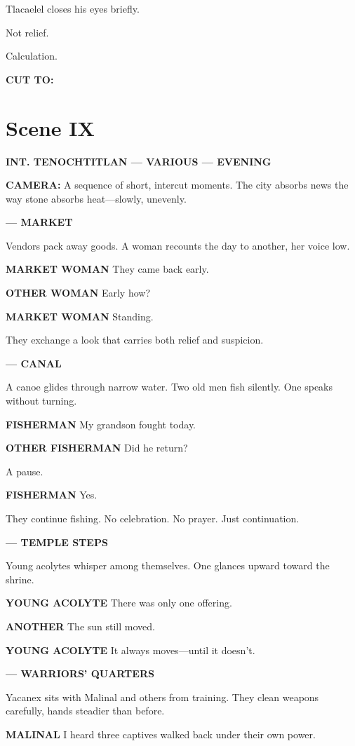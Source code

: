 \documentclass[12pt]{article}
\begin{document}
Tlacaelel closes his eyes briefly.

Not relief.

Calculation.

\textbf{CUT TO:}

\section*{Scene IX}

\textbf{INT. TENOCHTITLAN — VARIOUS — EVENING}

\textbf{CAMERA:} A sequence of short, intercut moments. The city absorbs news the way stone absorbs heat—slowly, unevenly.

\textbf{— MARKET}

Vendors pack away goods. A woman recounts the day to another, her voice low.

\textbf{MARKET WOMAN}  
They came back early.

\textbf{OTHER WOMAN}  
Early how?

\textbf{MARKET WOMAN}  
Standing.

They exchange a look that carries both relief and suspicion.

\textbf{— CANAL}

A canoe glides through narrow water. Two old men fish silently. One speaks without turning.

\textbf{FISHERMAN}  
My grandson fought today.

\textbf{OTHER FISHERMAN}  
Did he return?

A pause.

\textbf{FISHERMAN}  
Yes.

They continue fishing. No celebration. No prayer. Just continuation.

\textbf{— TEMPLE STEPS}

Young acolytes whisper among themselves. One glances upward toward the shrine.

\textbf{YOUNG ACOLYTE}  
There was only one offering.

\textbf{ANOTHER}  
The sun still moved.

\textbf{YOUNG ACOLYTE}  
It always moves—until it doesn’t.

\textbf{— WARRIORS’ QUARTERS}

Yacanex sits with Malinal and others from training. They clean weapons carefully, hands steadier than before.

\textbf{MALINAL}  
I heard three captives walked back under their own power.
\end{document}
